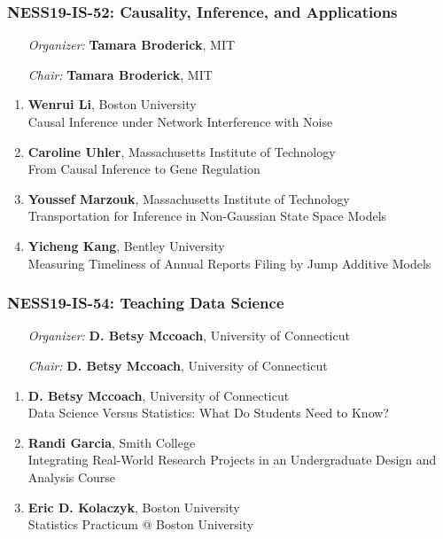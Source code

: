 \subsubsection*{NESS19-IS-52: Causality, Inference, and Applications}

\begin{enumerate}[align=left]
\item [\emph{Organizer:}] \textbf{Tamara Broderick}, MIT
\item [\emph{Chair:}] \textbf{Tamara Broderick}, MIT
\end{enumerate}

\begin{enumerate}
\item \textbf{Wenrui Li}, Boston University \\
Causal Inference under Network Interference with Noise
\item \textbf{Caroline Uhler}, Massachusetts Institute of Technology \\
From Causal Inference to Gene Regulation
\item \textbf{Youssef Marzouk}, Massachusetts Institute of Technology \\
Transportation for Inference in Non-Gaussian State Space Models
\item \textbf{Yicheng Kang}, Bentley University \\
Measuring Timeliness of Annual Reports Filing by Jump Additive Models
\end{enumerate}

\subsubsection*{NESS19-IS-54: Teaching Data Science}

\begin{enumerate}[align=left]
\item [\emph{Organizer:}] \textbf{D. Betsy Mccoach}, University of Connecticut
\item [\emph{Chair:}] \textbf{D. Betsy Mccoach}, University of Connecticut
\end{enumerate}

\begin{enumerate}
\item \textbf{D. Betsy Mccoach}, University of Connecticut \\
Data Science Versus Statistics: What Do Students Need to Know?
\item \textbf{Randi Garcia}, Smith College \\
Integrating Real-World Research Projects in an Undergraduate Design and Analysis Course
\item \textbf{Eric D. Kolaczyk}, Boston University \\
Statistics Practicum @ Boston University
\end{enumerate}

